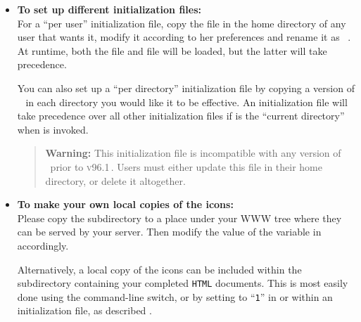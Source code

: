 \begin{itemize}
\par

%
%
\label{initfile}%
\item \textbf{To set up different initialization files:}\\
For a ``per user'' initialization file, 
copy the file  in the home directory
of any user that wants it, modify it according to her preferences and
rename it as \ . At runtime, both the 
 file and  file will be
loaded, but the latter will take precedence.

%

You can also set up a ``per directory'' initialization file by 
copying a version of \  in each directory you
would like it to be effective. An initialization file
 will take precedence over all other
initialization files if  is the ``current directory'' when
\latextohtml{} is invoked.

% 
\begin{quotation}\noindent 
\textbf{Warning: }%
This initialization file is incompatible with
any version of \latextohtml\ prior to \textsc{v96.1}\,.  
Users must either update this file in their home directory, 
or delete it altogether.
\end{quotation}

%
\item \label{icondir}%
\textbf{To make your own local copies of the \latextohtml{} icons:} \\
Please copy the  subdirectory to a 
place under your WWW tree
where they can be served by your server.
Then modify the value of the  variable in 
 accordingly.
%
\begin{changebar}%
Alternatively, a local copy of the icons can be included within
the subdirectory containing your completed \texttt{HTML} documents.
This is most easily done using the  command-line switch,
or by setting  to ``\texttt{1}'' in 
or within an initialization file, as described .
\end{changebar}


\end{itemize}
